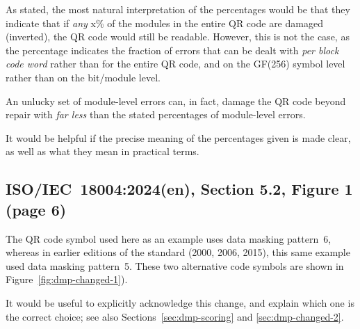 \documentclass[a4paper,twoside]{article}
\newcommand{\shortstandard}{ISO/IEC~18004}
\newcommand{\standard}{\shortstandard:2024(en)}
\begin{document}
As stated, the most natural interpretation of the percentages would be that they indicate that if \emph{any} x\% of the
modules in the entire QR code are damaged (inverted), the QR code would still be readable. However, this is not the
case, as the percentage indicates the fraction of errors that can be dealt with \emph{per block code word} rather than for
the entire QR code, and on the GF(256) symbol level rather than on the bit/module level.

An unlucky set of module-level errors can, in fact, damage the QR code beyond repair with \emph{far less} than the stated
percentages of module-level errors.

It would be helpful if the precise meaning of the percentages given is made clear, as well as what they mean in practical
terms.

\subsection{\standard, Section 5.2, Figure 1 (page 6)}
\label{sec:dmp-changed-1}

The QR code symbol used here as an example uses data masking pattern~6, whereas in earlier editions of the standard
(2000, 2006, 2015), this same example used data masking pattern~5.
These two alternative code symbols are shown in Figure~\ref{fig:dmp-changed-1}).

It would be useful to explicitly acknowledge this change, and explain which one is the correct choice;
see also Sections~\ref{sec:dmp-scoring} and \ref{sec:dmp-changed-2}.
\end{document}
